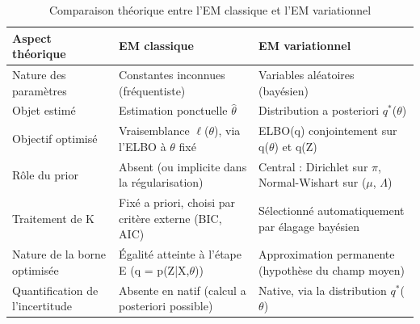\begin{table}[H]
\centering
\small
\setlength{\tabcolsep}{0.14cm}
\begin{tabular}{|p{4.84cm}|p{4.84cm}|p{4.84cm}|}
\hline
\textbf{Aspect théorique} & \textbf{EM classique} & \textbf{EM variationnel} \\
\hline
Nature des paramètres & Constantes inconnues (fréquentiste) & Variables aléatoires (bayésien) \\
\hline
Objet estimé & Estimation ponctuelle $\hat{\theta }$ & Distribution a posteriori $q^{*}$($\theta $) \\
\hline
Objectif optimisé & Vraisemblance $\ell $($\theta $), via l'ELBO à $\theta $ fixé & ELBO(q) conjointement sur q($\theta $) et q(Z) \\
\hline
Rôle du prior & Absent (ou implicite dans la régularisation) & Central : Dirichlet sur $\pi $, Normal-Wishart sur ($\mu $, $\Lambda $) \\
\hline
Traitement de K & Fixé a priori, choisi par critère externe (BIC, AIC) & Sélectionné automatiquement par élagage bayésien \\
\hline
Nature de la borne optimisée & Égalité atteinte à l'étape E (q = p(Z|X,$\theta $)) & Approximation permanente (hypothèse du champ moyen) \\
\hline
Quantification de l'incertitude & Absente en natif (calcul a posteriori possible) & Native, via la distribution $q^{*}$($\theta $) \\
\hline
\end{tabular}
\caption{Comparaison théorique entre l'EM classique et l'EM variationnel}
\label{tab:2_1}
\end{table}

